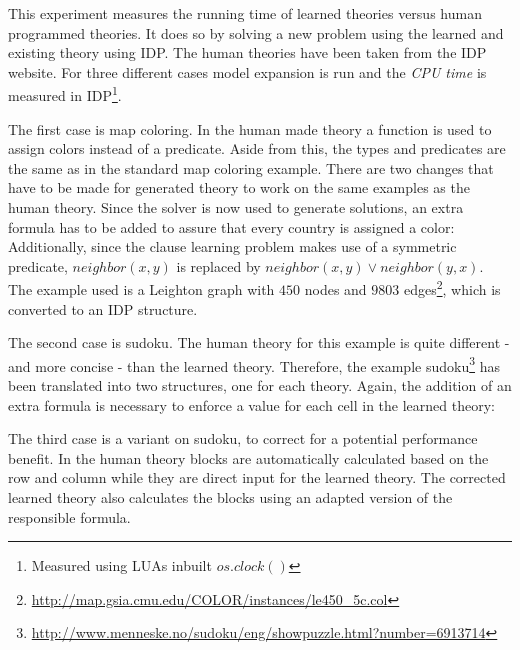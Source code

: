 \begin{experiment}
	This experiment measures the running time of learned theories versus human programmed theories.
	It does so by solving a new problem using the learned and existing theory using IDP.
	The human theories have been taken from the IDP website.
	For three different cases model expansion is run and the \emph{CPU time} is measured in IDP\footnote{Measured using LUAs inbuilt $os.clock()$}.

	The first case is map coloring.
	In the human made theory a function is used to assign colors instead of a predicate.
	Aside from this, the types and predicates are the same as in the standard map coloring example.
	There are two changes that have to be made for generated theory to work on the same examples as the human theory.
	Since the solver is now used to generate solutions, an extra formula has to be added to assure that every country is assigned a color:
	Additionally, since the clause learning problem makes use of a symmetric predicate, $\mathit{neighbor}(x, y)$ is replaced by $\mathit{neighbor}(x, y) \lor \mathit{neighbor(y,x)}$.
	The example used is a Leighton graph with $450$ nodes and $9803$ edges\footnote{\url{http://map.gsia.cmu.edu/COLOR/instances/le450_5c.col}}, which is converted to an IDP structure.

	The second case is sudoku.
	The human theory for this example is quite different - and more concise - than the learned theory.
	Therefore, the example sudoku\footnote{\url{http://www.menneske.no/sudoku/eng/showpuzzle.html?number=6913714}} has been translated into two structures, one for each theory.
	Again, the addition of an extra formula is necessary to enforce a value for each cell in the learned theory: 

	The third case is a variant on sudoku, to correct for a potential performance benefit.
	In the human theory blocks are automatically calculated based on the row and column while they are direct input for the learned theory.
	The corrected learned theory also calculates the blocks using an adapted version of the responsible formula.


\end{experiment}
